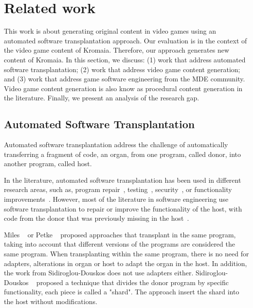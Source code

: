 \section{Related work} \label{sec:Related}

This work is about generating original content in video games using an automated software transplantation approach. Our evaluation is in the context of the video game content of Kromaia. Therefore, our approach generates new content of Kromaia. In this section, we discuss: (1) work that address automated software transplantation; (2) work that address video game content generation; and (3) work that address game software engineering from the MDE community. Video game content generation is also know as procedural content generation in the literature. Finally, we present an analysis of the research gap.

\subsection{Automated Software Transplantation}

Automated software transplantation address the challenge of automatically transferring a fragment of code, an organ, from one program, called donor, into another program, called host.

In the literature, automated software transplantation has been used in different research areas, such as, program repair~\cite{weimer2009automatically,sidiroglou2014automatic}, testing~\cite{zhang2017automated}, security~\cite{yang2017malware}, or functionality improvements~\cite{sidiroglou2017codecarboncopy}. However, most of the literature in software engineering use software transplantation to repair or improve the functionality of the host, with code from the donor that was previously missing in the host~\cite{marginean2021automated}. 

Miles \etal~\cite{miles2012situ} or Petke \etal~\cite{} proposed approaches that transplant in the same program, taking into account that different versions of the programs are considered the same program. When transplanting within the same program, there is no need for adapters, alterations in organ or host to adapt the organ in the host. In addition, the work from Sidiroglou-Douskos does not use adapters either. Sidiroglou-Douskos \etal~\cite{sidiroglou2015horizontal} proposed a technique that divides the donor program by specific functionality, each piece is called a "shard". The approach insert the shard into the host without modifications.

